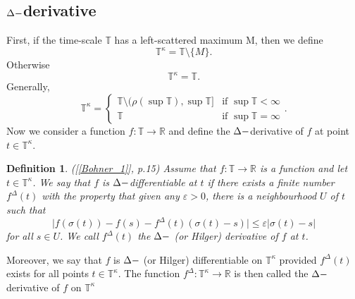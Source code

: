 \documentclass[12pt,a4paper,oneside,titlepage]{article}
\newtheorem{Def}{Definition}
\renewcommand{\epsilon}{\varepsilon}
\begin{document}
\subsection{ $\Delta \-- $derivative}
First, if the time-scale $\mathbb{T}$ has a left-scattered maximum M, then we define 
\begin{equation}
\label{kappa}
\mathbb{T^{\kappa}} = \mathbb{T} \setminus \lbrace M \rbrace.
\end{equation}
Otherwise
\begin{equation}
\nonumber
\mathbb{T}^{\kappa}= \mathbb{T} .
\end{equation}
Generally,
\begin{equation}
\label{T_kappa}
\mathbb{T}^{\kappa}= \left\{ \begin{array}{ll}
\mathbb{T} \setminus (\rho(\sup \mathbb{T}), \sup \mathbb{T}] & \textrm{if $\sup \mathbb{T} < \infty$}\\
\mathbb{T} & \textrm{if $\sup \mathbb{T} = \infty$}
\end{array} \right. .
\end{equation}
Now we consider a function $f: \mathbb{T} \rightarrow \mathbb{R}$ and define the $\Delta \-- $derivative of $f$ at point $t \in \mathbb{T}^{\kappa}$.
\begin{Def} ([\ref{Bohner_1}], p.15) Assume that $f: \mathbb{T} \rightarrow \mathbb{R}$ is a function and let $t\in \mathbb{T}^{\kappa}$. We say that $f$ is $\Delta \-- $differentiable at $t$ if there exists a finite number $f^{\Delta}(t)$  with the property that given any $\epsilon>0$, there is a neighbourhood $U$ of $t$ such that
\begin{equation}
\nonumber
\vert f(\sigma (t)) - f(s) - f^{\Delta}(t) (\sigma(t)-s) \vert \leq \epsilon \vert \sigma(t) -s \vert 
\end{equation}
for all $s \in U$. We call $f^{\Delta}(t)$ the $\Delta \-- $ (or Hilger) derivative of $f$ at $t$.
\end{Def}
Moreover, we say that $f$ is $ \Delta \-- $ (or Hilger) differentiable on $\mathbb{T}^{\kappa}$ provided $f^{\Delta}(t)$ exists for all points $ t \in \mathbb{T}^{\kappa}$. The function $f^{\Delta}: \mathbb{T}^{\kappa} \rightarrow \mathbb{R}$ is then called the $\Delta \-- $derivative of $f$ on $\mathbb{T}^{\kappa}$  
\end{document}
